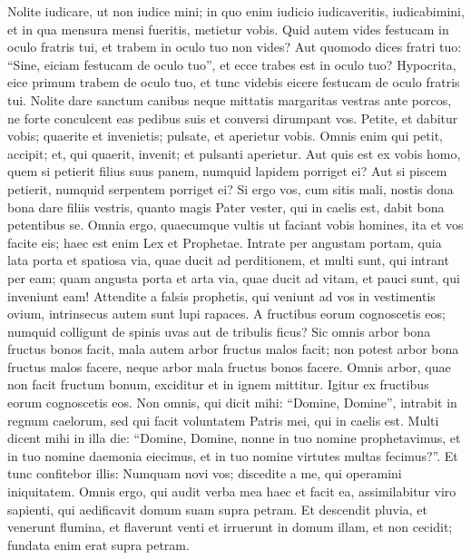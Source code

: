 \begin{biblechapter}
\begin{biblechapter}
\begin{biblechapter}
\begin{biblechapter}
\begin{biblechapter}
\begin{biblechapter}
\begin{biblechapter}
\verse Nolite iudicare, ut non iudice mini; 
\verse in quo enim iudicio iudicaveritis, iudicabimini, et in qua mensura mensi fueritis, metietur vobis. 
\verse Quid autem vides festucam in oculo fratris tui, et trabem in oculo tuo non vides? 
\verse Aut quomodo dices fratri tuo: “Sine, eiciam festucam de oculo tuo”, et ecce trabes est in oculo tuo? 
\verse Hypocrita, eice primum trabem de oculo tuo, et tunc videbis eicere festucam de oculo fratris tui.
 \verse Nolite dare sanctum canibus neque mittatis margaritas vestras ante porcos, ne forte conculcent eas pedibus suis et conversi dirumpant vos.
 \verse Petite, et dabitur vobis; quaerite et invenietis; pulsate, et aperietur vobis. 
\verse Omnis enim qui petit, accipit; et, qui quaerit, invenit; et pulsanti aperietur. 
\verse Aut quis est ex vobis homo, quem si petierit filius suus panem, numquid lapidem porriget ei? 
\verse Aut si piscem petierit, numquid serpentem porriget ei? 
\verse Si ergo vos, cum sitis mali, nostis dona bona dare filiis vestris, quanto magis Pater vester, qui in caelis est, dabit bona petentibus se.
 \verse Omnia ergo, quaecumque vultis ut faciant vobis homines, ita et vos facite eis; haec est enim Lex et Prophetae.
 \verse Intrate per angustam portam, quia lata porta et spatiosa via, quae ducit ad perditionem, et multi sunt, qui intrant per eam; 
\verse quam angusta porta et arta via, quae ducit ad vitam, et pauci sunt, qui inveniunt eam!
 \verse Attendite a falsis prophetis, qui veniunt ad vos in vestimentis ovium, intrinsecus autem sunt lupi rapaces. 
\verse A fructibus eorum cognoscetis eos; numquid colligunt de spinis uvas aut de tribulis ficus? 
\verse Sic omnis arbor bona fructus bonos facit, mala autem arbor fructus malos facit; 
\verse non potest arbor bona fructus malos facere, neque arbor mala fructus bonos facere. 
 \verse Omnis arbor, quae non facit fructum bonum, exciditur et in ignem mittitur. 
 \verse Igitur ex fructibus eorum cognoscetis eos.
 \verse Non omnis, qui dicit mihi: “Domine, Domine”, intrabit in regnum caelorum, sed qui facit voluntatem Patris mei, qui in caelis est. 
\verse Multi dicent mihi in illa die: “Domine, Domine, nonne in tuo nomine prophetavimus, et in tuo nomine daemonia eiecimus, et in tuo nomine virtutes multas fecimus?”. 
\verse Et tunc confitebor illis: Numquam novi vos; discedite a me, qui operamini iniquitatem.
 \verse Omnis ergo, qui audit verba mea haec et facit ea, assimilabitur viro sapienti, qui aedificavit domum suam supra petram. 
\verse Et descendit pluvia, et venerunt flumina, et flaverunt venti et irruerunt in domum illam, et non cecidit; fundata enim erat supra petram.

\end{biblechapter}
\end{biblechapter}
\end{biblechapter}
\end{biblechapter}
\end{biblechapter}
\end{biblechapter}
\end{biblechapter}
